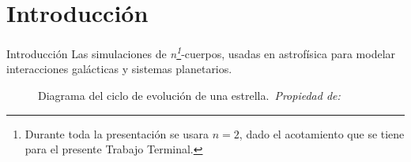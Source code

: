 \section{Introducción}

\begin{frame}{Introducción}
    \vspace{-0.15cm}
    {\fontsize{8pt}{10pt}\selectfont
    Las simulaciones de \textit{n\footnote{\tiny Durante toda la presentación se usara $n = 2$, dado el acotamiento que se tiene para el presente Trabajo Terminal.}}-cuerpos, usadas en astrofísica para modelar interacciones galácticas y sistemas planetarios. %
    }
    \vspace{0cm}
    \begin{figure}[H]
        \centering
        \vspace{-0.25cm}
        \caption{\tiny Diagrama del ciclo de evolución de una estrella.~\textit{Propiedad de: }~\cite{smartyprints_constellation_poster_2025}}%
        \label{fig:star-constellation-map}
    \end{figure}
\end{frame}

